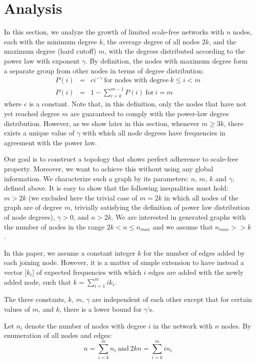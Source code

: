 \documentclass[10pt,journal,cspaper,compsoc]{IEEEtran}
\begin{document}
\section{Analysis}
\label{sec:analysis}

In this section, we analyze the growth of limited scale-free networks with $n$ nodes, each with the minimum degree $k$, the average degree of all nodes $2k$, and the  maximum degree (hard cutoff) $m$, with the degrees distributed according to the power law with exponent $\gamma$. By definition, the nodes with maximum degree form a separate group from other nodes in terms of degree distribution:
\begin{eqnarray*}
P(i) &=& ci^{-\gamma}~\mbox{for nodes with degree}~k\leq i<m\\
P(i) &=& 1-\sum_{i=k}^{m-1}{P(i)}~\mbox{for}~i=m
\end{eqnarray*}
where $c$ is a constant. Note that, in this definition, only the nodes that have not yet reached degree $m$ are guaranteed to comply with the power-law degree distribution. 
However, as we show later in this section, whenever $m\geq 3k$, there exists a unique value of $\gamma$ with which all node degrees have frequencies in agreement with the power law.

Our goal is to construct a topology that shows perfect adherence to scale-free property. Moreover, we want to achieve this without using any global information. We characterize such a graph by its parameters: $n$, $m$, $k$ and $\gamma$, defined above. It is easy to show that the following inequalities must hold: $m>2k$ (we excluded here the trivial case of $m=2k$ in which all nodes of the graph are of degree $m$, trivially satisfying the definition of power law distribution of node degrees), $\gamma > 0$, and $n>2k$. We are interested in generated graphs with the number of nodes in the range $2k<n\leq n_{max}$ and we assume that $n_{max}>>k$.

In this paper, we assume a constant integer $k$ for the number of edges added by each joining node. However, it is a matter of simple extension to have instead a vector [$k_i$] of expected frequencies with which $i$ edges are added with the newly added node, such that  $k = \sum_{i=1}^{m}i k_i$.

The three constants, $k$, $m$, $\gamma$ are independent of each other except that for certain values of $m$, and $k$, there is a lower bound for $\gamma$'s.

Let $n_i$ denote the number of nodes with degree $i$ in the network with $n$ nodes.
By enumeration of all nodes and edges:
\begin{equation}
\label{eq1}
n = \sum_{i=k}^{m}n_i~\mbox{and}~2kn = \sum_{i=k}^{m} i n_i
\end{equation}	
\end{document}
